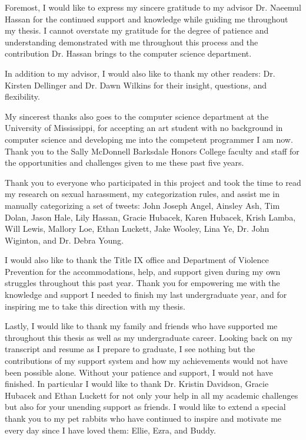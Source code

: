 \hfill \break

Foremost, I would like to express my sincere gratitude to my advisor Dr. Naeemul Hassan for the continued support and knowledge while guiding me throughout my thesis. I cannot overstate my gratitude for the degree of patience and understanding demonstrated with me throughout this process and the contribution Dr. Hassan brings to the computer science department.

In addition to my advisor, I would also like to thank my other readers: Dr. Kirsten Dellinger and Dr. Dawn Wilkins for their insight, questions, and flexibility.

My sincerest thanks also goes to the computer science department at the University of Mississippi, for accepting an art student with no background in computer science and developing me into the competent programmer I am now. Thank you to the Sally McDonnell Barksdale Honors College faculty and staff for the opportunities and challenges given to me these past five years.

Thank you to everyone who participated in this project and took the time to read my research on sexual harassment, my categorization rules, and assist me in manually categorizing a set of tweets: John Joseph Angel, Ainsley Ash, Tim Dolan, Jason Hale, Lily Hassan, Gracie Hubacek, Karen Hubacek, Krish Lamba, Will Lewis, Mallory Loe, Ethan Luckett, Jake Wooley, Lina Ye, Dr. John Wiginton, and Dr. Debra Young.

I would also like to thank the Title IX office and Department of Violence Prevention for the accommodations, help, and support given during my own struggles throughout this past year. Thank you for empowering me with the knowledge and support I needed to finish my last undergraduate year, and for inspiring me to take this direction with my thesis.

Lastly, I would like to thank my family and friends who have supported me throughout this thesis as well as my undergraduate career. Looking back on my transcript and resume as I prepare to graduate, I see nothing but the contributions of my support system and how my achievements would not have been possible alone. Without your patience and support, I would not have finished. In particular I would like to thank Dr. Kristin Davidson, Gracie Hubacek and Ethan Luckett for not only your help in all my academic challenges but also for your unending support as friends. I would like to extend a special thank you to my pet rabbits who have continued to inspire and motivate me every day since I have loved them: Ellie, Ezra, and Buddy.
